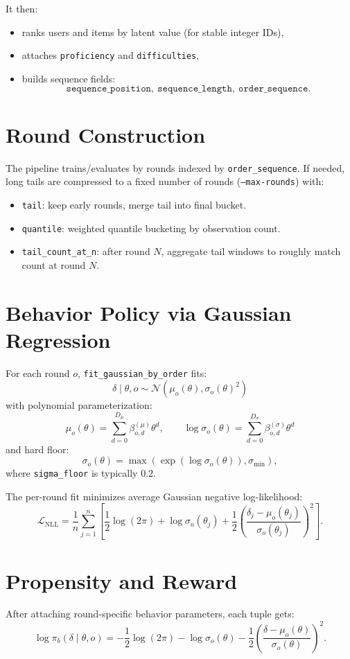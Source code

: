 \documentclass[11pt]{article}
\begin{document}
It then:
\begin{itemize}
  \item ranks users and items by latent value (for stable integer IDs),
  \item attaches \texttt{proficiency} and \texttt{difficulties},
  \item builds sequence fields:
  \[
  \texttt{sequence\_position},\ \texttt{sequence\_length},\ \texttt{order\_sequence}.
  \]
\end{itemize}

\section{Round Construction}
The pipeline trains/evaluates by rounds indexed by \texttt{order\_sequence}. If needed, long tails are compressed to a fixed number of rounds (\texttt{--max-rounds}) with:
\begin{itemize}
  \item \texttt{tail}: keep early rounds, merge tail into final bucket.
  \item \texttt{quantile}: weighted quantile bucketing by observation count.
  \item \texttt{tail\_count\_at\_n}: after round $N$, aggregate tail windows to roughly match count at round $N$.
\end{itemize}

\section{Behavior Policy via Gaussian Regression}
For each round $o$, \texttt{fit\_gaussian\_by\_order} fits:
\[
\delta \mid \theta,o \sim \mathcal{N}(\mu_o(\theta),\sigma_o(\theta)^2)
\]
with polynomial parameterization:
\[
\mu_o(\theta)=\sum_{d=0}^{D_\mu}\beta^{(\mu)}_{o,d}\theta^d,\qquad
\log \sigma_o(\theta)=\sum_{d=0}^{D_\sigma}\beta^{(\sigma)}_{o,d}\theta^d
\]
and hard floor:
\[
\sigma_o(\theta)=\max\!\left(\exp(\log \sigma_o(\theta)),\sigma_{\min}\right),
\]
where \texttt{sigma\_floor} is typically $0.2$.

The per-round fit minimizes average Gaussian negative log-likelihood:
\[
\mathcal{L}_{\text{NLL}}=
\frac{1}{n}\sum_{j=1}^n
\left[
\frac{1}{2}\log(2\pi)+\log \sigma_o(\theta_j)
+\frac{1}{2}\left(\frac{\delta_j-\mu_o(\theta_j)}{\sigma_o(\theta_j)}\right)^2
\right].
\]

\section{Propensity and Reward}
After attaching round-specific behavior parameters, each tuple gets:
\[
\log \pi_b(\delta\mid\theta,o)=
-\frac{1}{2}\log(2\pi)-\log \sigma_o(\theta)
-\frac{1}{2}\left(\frac{\delta-\mu_o(\theta)}{\sigma_o(\theta)}\right)^2.
\]
\end{document}
